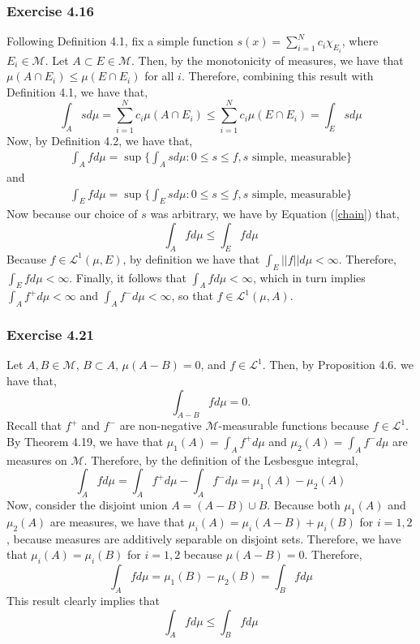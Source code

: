\documentclass[letterpaper,12pt]{article}
\theoremstyle{definition}
\begin{document}
\subsubsection*{Exercise 4.16}
Following Definition 4.1, fix a simple function $s(x) = \sum_{i=1}^{N} c_i \chi_{E_{i}}$, where $E_i \in \mathcal{M}$. Let $A \subset E \in \mathcal{M}$. Then, by the monotonicity of measures, we have that $\mu(A \cap E_i) \leq \mu(E \cap E_i)$ for all $i$. Therefore, combining this result with Definition 4.1, we have that,
\begin{equation} \label{chain}
	\int_A  sd\mu = \sum_{i=1}^{N} c_i \mu(A \cap E_i) \leq \sum_{i=1}^{N} c_i \mu(E \cap E_i) = \int_E s d\mu
\end{equation}
Now, by Definition 4.2, we have that,
\begin{align*}
	\int_A f d\mu = \sup \{ \int_A s d\mu : 0 \leq s \leq f, s \text{ simple, measurable}  \}
\end{align*}
and 
\begin{align*}
	\int_E f d\mu = \sup \{ \int_E s d\mu : 0 \leq s \leq f, s \text{ simple, measurable}  \}
\end{align*}
Now because our choice of $s$ was arbitrary, we have by Equation (\ref{chain}) that,
\begin{equation}
 \int_A f d\mu \leq \int_E f d\mu 
\end{equation}
Because $f \in \mathscr{L}^1(\mu, E)$, by definition we have that $\int_E ||f|| d\mu < \infty$. Therefore, $\int_E f d\mu <\infty$. Finally, it follows that $\int_A f d\mu < \infty$, which in turn implies $\int_A f^+ d\mu < \infty$ and $\int_A f^{-} d\mu < \infty$, so that $f \in \mathscr{L}^1 (\mu, A)$.

\subsubsection*{Exercise 4.21}
Let $A, B \in \mathcal{M}$, $B \subset A$, $\mu(A - B) = 0$, and $f \in \mathscr{L}^1$. Then, by Proposition 4.6. we have that,
\begin{equation}
  \int_{A-B} f d\mu = 0.
\end{equation}
Recall that $f^+$ and $f^-$ are non-negative $\mathcal{M}$-measurable functions because $f \in \mathscr{L}^1$. By Theorem 4.19, we have that $\mu_1(A) =  \int_A f^+ d\mu$ and $\mu_2(A) = \int_A f^- d\mu$ are measures on $\mathcal{M}$. Therefore, by the definition of the Lesbesgue integral, 
\begin{equation}
	\int_A f d\mu =  \int_A f^+ d\mu -  \int_A f^- d\mu = \mu_1(A) - \mu_2(A)
\end{equation}
Now, consider the disjoint union $A = (A - B) \cup B$.  Because both $\mu_1(A)$ and $\mu_2(A)$ are measures, we have that $\mu_i(A) = \mu_i(A - B) + \mu_i(B)$ for $i=1,2$, because measures are additively separable on disjoint sets. Therefore, we have that $\mu_i(A) = \mu_i (B)$ for $i=1,2$ because $\mu(A - B) = 0$. Therefore,
\begin{equation}
	\int_A f d\mu = \mu_1(B) - \mu_2(B) = \int_B f d\mu
\end{equation}
This result clearly implies that
\begin{equation}
	\int_A f d\mu \leq \int_{B} f d\mu
\end{equation}
\end{document}
